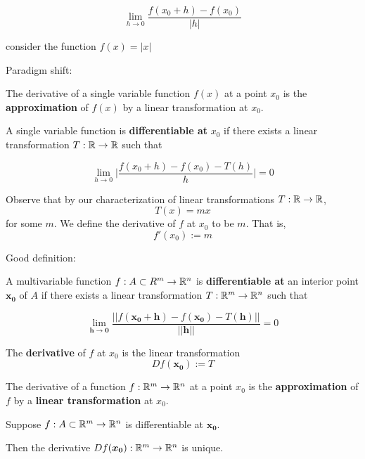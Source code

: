 $$\lim_{h \to 0} \frac{f(x_0+h)-f(x_0)}{|h|}$$

consider the function $f(x) = |x|$




\begin{motivating}
    Paradigm shift:
\end{motivating}


    The derivative of a single variable function $f(x)$ at a point $x_0$ is the \textbf{approximation} of $f(x)$ by a linear transformation at $x_0$.

\begin{definition}
    A single variable function is \textbf{differentiable at }$x_0$ if there exists a linear transformation $T: \mathbb{R} \to \mathbb{R}$ such that 
    
    $$\lim_{h \to 0} \bigg|\frac{f(x_0+h)-f(x_0)-T(h)}{h}\bigg| = 0$$
    
    Observe that by our characterization of linear transformations $T: \mathbb{R} \to \mathbb{R}$, $$T(x) = mx$$ for some $m$.  We define the derivative of $f$ at $x_0$ to be $m$. That is,    
    $$f'(x_0) := m$$
    \end{definition}



Good definition:

\begin{definition}
    A multivariable function $f : A \subset R^m \to \mathbb{R}^n$ is \textbf{differentiable at} an interior point $\bm{x_0}$ of $A$  if there exists a linear transformation $T: \mathbb{R}^m \to \mathbb{R}^n$ such that 
    
    $$\lim_{\bm{h} \to \bm{0}} \frac{||f(\bm{x_0+h})-f(\bm{x_0})-T(\bm{h})||}{||\bm{h}||} = 0$$
    
    The \textbf{derivative} of $f$ at $x_0$ is the linear transformation $$Df(\bm{x_0}) := T$$
    \end{definition}

\begin{remark}
    The derivative of a function $f : \mathbb{R}^m \to \mathbb{R}^n$ at a point $x_0$ is the \textbf{approximation} of $f$ by a \textbf{linear transformation} at $x_0$.
    \end{remark}

    \begin{proposition}[Uniqueness]
    Suppose $f : A \subset \mathbb{R}^m \to \mathbb{R}^n$ is differentiable at $\bm{x_0}$.
       
    \vspace{1em}
    Then the derivative $Df(\bm{x_0}) : \mathbb{R}^m \to \mathbb{R}^n$ is unique.
    \end{proposition}

